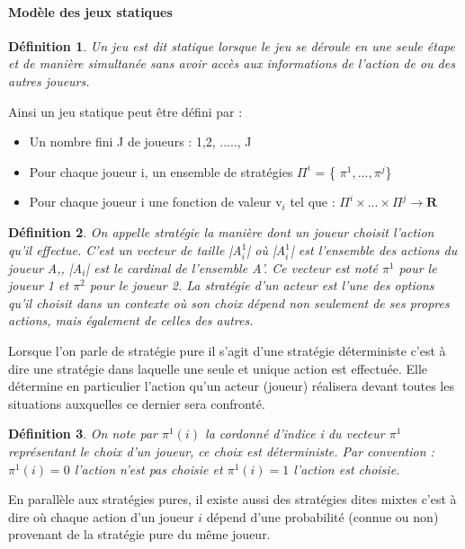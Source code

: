 \documentclass[a4paper, 12pt, twoside]{article}
\newtheorem{definition}{Définition}
\begin{document}
\paragraph{Modèle des jeux statiques}
\begin{definition}
Un jeu est dit statique lorsque le jeu se déroule en une seule étape et de manière simultanée sans avoir accès aux informations de l'action de ou des autres joueurs.
\end{definition} 

Ainsi un \textsf{jeu statique} peut être défini par : 
\begin{itemize}
\item Un nombre fini J de joueurs : {1,2, ....., J}
\item Pour chaque joueur \textsf{i}, un ensemble de stratégies $ \Pi^{i} $ = \{ $ \pi^{1} ,...,\pi^{j} $\}
\item Pour chaque joueur \textsf{i} une fonction de valeur \textsf{v}$_{i}$ tel que : 
$ \Pi^{i} \times ... \times \Pi^{j} \rightarrow \mathbf{R} $
\end{itemize}

\begin{definition}
On appelle stratégie la manière dont un joueur choisit l'action qu'il effectue. C'est un vecteur de taille |A$ _{i} ^{1}$| où |A$ _{i} ^{1}$| est l'ensemble des actions du joueur A,, |A$_{i}$| est le cardinal de l'ensemble A'. Ce vecteur est noté $\pi^{1}$ pour le joueur 1 et $\pi^{2}$ pour le joueur 2. La stratégie d’un acteur est l’une des options qu’il choisit dans un contexte où son choix dépend non seulement de ses propres actions, mais également de celles des autres.
\end{definition}

Lorsque l'on parle de stratégie pure il s'agit d'une stratégie déterministe c'est à dire une stratégie dans laquelle une seule et unique action est effectuée. Elle détermine en particulier l'action qu'un acteur (joueur) réalisera devant toutes les situations auxquelles ce dernier sera confronté. \newline

\begin{definition}
On note par $ \pi^{1}(i)$ la cordonné d'indice i du vecteur $\pi^{1}$ représentant le choix d'un joueur, ce choix est déterministe. Par convention :   $\pi^{1}(i) = 0$ l'action n'est pas choisie et  $\pi^{1}(i) =1$ l'action est choisie.
\end{definition}

En parallèle aux stratégies pures, il existe aussi des stratégies dites mixtes c'est à dire où chaque action d'un joueur $i$ dépend d'une probabilité (connue ou non) provenant de la stratégie pure du même joueur. \newline
\end{document}
